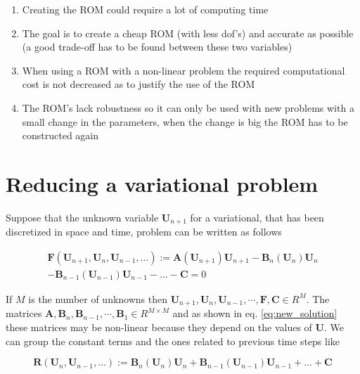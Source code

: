 \documentclass[twoside,11pt]{Latex/Classes/PhDthesisPSnPDF_jacob}
\begin{document}
\begin{enumerate}
\item Creating the ROM could require a lot of computing time
\item The goal is to create a cheap ROM (with less dof's) and accurate as possible (a good trade-off has to be found between these two variables)
\item When using a ROM with a non-linear problem the required computational cost is not decreased as to justify the use of the ROM
\item The ROM's lack robustness so it can only be used with new problems with a small change in the parameters, when the change is big the ROM has to be constructed again
\end{enumerate}


\section{Reducing a variational problem}

Suppose that the unknown variable $\mathbf{U}_{n+1}$ for a variational, that has been discretized in space and time, problem can be written as follows

\begin{multline}
\mathbf{F}(\mathbf{U}_{n+1},\mathbf{U}_{n},\mathbf{U}_{n-1},\ldots) := \mathbf{A}(\mathbf{U}_{n+1})\mathbf{U}_{n+1}  - \mathbf{B}_{n}(\mathbf{U}_{n})\mathbf{U}_{n} \\ - \mathbf{B}_{n-1}(\mathbf{U}_{n-1})\mathbf{U}_{n-1} - \ldots - \mathbf{C} = 0
\label{eq:new_solution}
\end{multline}

If $M$ is the number of unknowns then $\mathbf{U}_{n+1},\mathbf{U}_{n},\mathbf{U}_{n-1}, \cdots, \mathbf{F}, \mathbf{C} \in R^M$. The matrices $\mathbf{A},\mathbf{B}_{n},\mathbf{B}_{n-1},\cdots,\mathbf{B}_{1} \in R^{M\times M}$ and as shown in eq. \ref{eq:new_solution} these matrices may be non-linear because they depend on the values of $\mathbf{U}$. We can group the constant terms and the ones related to previous time steps like

\begin{equation}
\mathbf{R}(\mathbf{U}_{n},\mathbf{U}_{n-1},\ldots) := \mathbf{B}_{n}(\mathbf{U}_{n})\mathbf{U}_{n} + \mathbf{B}_{n-1}(\mathbf{U}_{n-1})\mathbf{U}_{n-1} + \ldots + \mathbf{C}
\end{equation}
\end{document}

